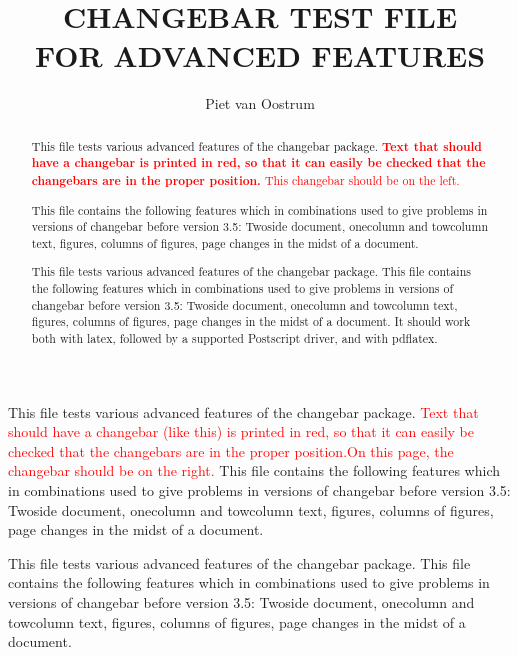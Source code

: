 \documentclass[12pt,twoside]{article}
\begin{document}

\title{CHANGEBAR TEST FILE \\FOR ADVANCED FEATURES}
\author{Piet van Oostrum}
\maketitle

\raggedbottom

\begin {abstract}

This file tests various advanced features of the changebar package.
\cbstart\textcolor{red}{\textbf{Text that should have a changebar is
  printed in red, so that it can easily be checked that the changebars are
  in the proper position.} This changebar should be on the left.
\cbend}

This file contains the following features which in combinations used to
give problems in  versions of changebar before version 3.5:
Twoside document, onecolumn and towcolumn text, figures, columns of
figures, page changes in the midst of a document.

This file tests various advanced features of the changebar package.
This file contains the following features which in combinations used to
give problems in  versions of changebar before version 3.5:
Twoside document, onecolumn and towcolumn text, figures, columns of
figures, page changes in the midst of a document.
It should work both with latex, followed by a supported Postscript driver,
and with pdflatex.
\end{abstract}

\newpage

This file tests various advanced features of the changebar package.
\cbstart\textcolor{red}{Text that should have a changebar (like this) is
  printed in red, so that it can easily be checked that the changebars are
  in the proper position.On this page, the changebar should be on the right.
\cbend}
This file contains the following features which in combinations used to
give problems in  versions of changebar before version 3.5:
Twoside document, onecolumn and towcolumn text, figures, columns of
figures, page changes in the midst of a document.

This file tests various advanced features of the changebar package.
This file contains the following features which in combinations used to
give problems in  versions of changebar before version 3.5:
Twoside document, onecolumn and towcolumn text, figures, columns of
figures, page changes in the midst of a document.
\end{document}
